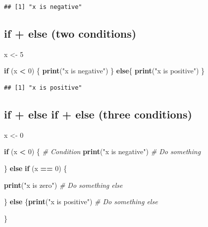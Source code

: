 \documentclass[
]{book}
\newenvironment{Shaded}{\begin{snugshade}}{\end{snugshade}}
\newcommand{\CommentTok}[1]{\textcolor[rgb]{0.56,0.35,0.01}{\textit{#1}}}
\newcommand{\ControlFlowTok}[1]{\textcolor[rgb]{0.13,0.29,0.53}{\textbf{#1}}}
\newcommand{\DecValTok}[1]{\textcolor[rgb]{0.00,0.00,0.81}{#1}}
\newcommand{\FunctionTok}[1]{\textcolor[rgb]{0.13,0.29,0.53}{\textbf{#1}}}
\newcommand{\NormalTok}[1]{#1}
\newcommand{\OtherTok}[1]{\textcolor[rgb]{0.56,0.35,0.01}{#1}}
\newcommand{\SpecialCharTok}[1]{\textcolor[rgb]{0.81,0.36,0.00}{\textbf{#1}}}
\newcommand{\StringTok}[1]{\textcolor[rgb]{0.31,0.60,0.02}{#1}}
\begin{document}
\begin{verbatim}
## [1] "x is negative"
\end{verbatim}

\subsection{if + else (two conditions)}\label{if-else-two-conditions}

\begin{Shaded}
\begin{Highlighting}[]
\NormalTok{x }\OtherTok{\textless{}{-}} \DecValTok{5}

\ControlFlowTok{if}\NormalTok{ (x }\SpecialCharTok{\textless{}} \DecValTok{0}\NormalTok{) \{}
  \FunctionTok{print}\NormalTok{(}\StringTok{"x is negative"}\NormalTok{)}
\NormalTok{\} }\ControlFlowTok{else}\NormalTok{\{}
  \FunctionTok{print}\NormalTok{(}\StringTok{"x is positive"}\NormalTok{)}
\NormalTok{\}}
\end{Highlighting}
\end{Shaded}

\begin{verbatim}
## [1] "x is positive"
\end{verbatim}

\subsection{if + else if + else (three conditions)}\label{if-else-if-else-three-conditions}

\begin{Shaded}
\begin{Highlighting}[]
\NormalTok{x }\OtherTok{\textless{}{-}} \DecValTok{0}

\ControlFlowTok{if}\NormalTok{ (x }\SpecialCharTok{\textless{}} \DecValTok{0}\NormalTok{) \{ }\CommentTok{\# Condition }
  \FunctionTok{print}\NormalTok{(}\StringTok{"x is negative"}\NormalTok{) }\CommentTok{\# Do something }

\NormalTok{  \} }\ControlFlowTok{else} \ControlFlowTok{if}\NormalTok{ (x }\SpecialCharTok{==} \DecValTok{0}\NormalTok{) \{ }
  
    \FunctionTok{print}\NormalTok{(}\StringTok{"x is zero"}\NormalTok{) }\CommentTok{\# Do something else }

\NormalTok{    \} }\ControlFlowTok{else}\NormalTok{ \{}\FunctionTok{print}\NormalTok{(}\StringTok{"x is positive"}\NormalTok{) }\CommentTok{\# Do something else }

\NormalTok{      \}}
\end{Highlighting}
\end{Shaded}
\end{document}
